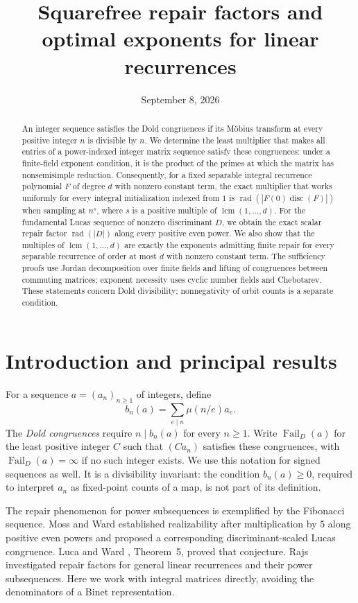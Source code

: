 \documentclass[11pt]{article}
\title{Squarefree repair factors and optimal exponents for linear recurrences}
\author{}
\date{September 8, 2026}
\theoremstyle{remark}
\newcommand{\rad}{\operatorname{rad}}
\newcommand{\disc}{\operatorname{disc}}
\newcommand{\Fail}{\operatorname{Fail}_{D}}
\newcommand{\lcm}{\operatorname{lcm}}
\begin{document}
\maketitle
\begin{abstract}
An integer sequence satisfies the Dold congruences if its M\"obius transform at every positive integer $n$ is divisible by $n$. We determine the least multiplier that makes all entries of a power-indexed integer matrix sequence satisfy these congruences: under a finite-field exponent condition, it is the product of the primes at which the matrix has nonsemisimple reduction. Consequently, for a fixed separable integral recurrence polynomial $F$ of degree $d$ with nonzero constant term, the exact multiplier that works uniformly for every integral initialization indexed from $1$ is $\rad(|F(0)\disc(F)|)$ when sampling at $n^s$, where $s$ is a positive multiple of $\lcm(1,\ldots,d)$. For the fundamental Lucas sequence of nonzero discriminant $D$, we obtain the exact scalar repair factor $\rad(|D|)$ along every positive even power. We also show that the multiples of $\lcm(1,\ldots,d)$ are exactly the exponents admitting finite repair for every separable recurrence of order at most $d$ with nonzero constant term. The sufficiency proofs use Jordan decomposition over finite fields and lifting of congruences between commuting matrices; exponent necessity uses cyclic number fields and Chebotarev. These statements concern Dold divisibility; nonnegativity of orbit counts is a separate condition.
\end{abstract}


\section{Introduction and principal results}

For a sequence $a=(a_n)_{n\geq1}$ of integers, define
\[
 b_n(a)=\sum_{e\mid n}\mu(n/e)a_e.
\]
The \emph{Dold congruences} require $n\mid b_n(a)$ for every $n\geq1$.
Write $\Fail(a)$ for the least positive integer $C$ such that $(Ca_n)$ satisfies these congruences, with $\Fail(a)=\infty$ if no such integer exists. We use this notation for signed sequences as well. It is a divisibility invariant: the condition $b_n(a)\geq0$, required to interpret $a_n$ as fixed-point counts of a map, is not part of its definition.

The repair phenomenon for power subsequences is exemplified by the Fibonacci sequence. Moss and Ward \cite{MW} established realizability after multiplication by $5$ along positive even powers and proposed a corresponding discriminant-scaled Lucas congruence. Luca and Ward \cite{LW}, Theorem~5, proved that conjecture. Rajs \cite{Rajs} investigated repair factors for general linear recurrences and their power subsequences. Here we work with integral matrices directly, avoiding the denominators of a Binet representation.
\end{document}

